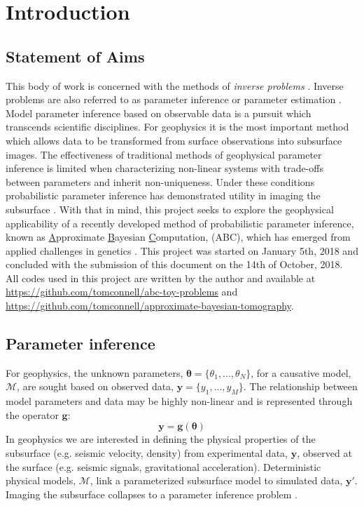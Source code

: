 \chapter{Introduction}


\section{Statement of Aims} 

This body of work is concerned with the methods of \textit{inverse problems} \citep{Tarantola2005,Aster2013,Menke2012,Kaipio2006,Biegler2010,Idier2013}. Inverse problems are also referred to as parameter inference or parameter estimation \citep{Box1973,Sprott2008,Casella1993,Cox2007}. Model parameter inference based on observable data is a pursuit which transcends scientific disciplines. For geophysics it is the most important method which allows data to be transformed from surface observations into subsurface images. The effectiveness of traditional methods of geophysical parameter inference is limited when characterizing non-linear systems with trade-offs between parameters and inherit non-uniqueness. Under these conditions probabilistic parameter inference has demonstrated utility in imaging the subsurface \citep{Tarantola2005}. With that in mind, this project seeks to explore the geophysical applicability of a recently developed method of probabilistic parameter inference, known as \underline{A}pproximate \underline{B}ayesian \underline{C}omputation, (ABC), which has emerged from applied challenges in genetics \citep{Tavare1997,Beaumont2002,Sunnaker2013}. This project was started on January 5th, 2018 and concluded with the submission of this document on the 14th of October, 2018. All codes used in this project are written by the author and available at \url{https://github.com/tomconnell/abc-toy-problems} and \url{https://github.com/tomconnell/approximate-bayesian-tomography}.

\section{Parameter inference}

For geophysics, the unknown parameters, $\bm{\theta} = \{\theta_1,...,\theta_N\}$, for a causative model, $\mathcal{M}$, are sought based on observed data, $\bm{y} = \{y_1,...,y_M\}$. The relationship between model parameters and data may be highly non-linear and is represented through the operator $\bm{g}$:
\begin{equation}
\bm{y} = \bm{g}(\bm{\theta})
\label{basic_data_parameters}
\end{equation}
In geophysics we are interested in defining the physical properties  of the subsurface (e.g. seismic velocity, density) from experimental data, $\bm{y}$, observed at the surface (e.g. seismic signals, gravitational acceleration). Deterministic physical models, $\mathcal{M}$, link a parameterized subsurface model to simulated data, $\bm{y'}$. Imaging the subsurface collapses to a parameter inference problem \citep[p.1-2]{Tarantola2005}.\par

